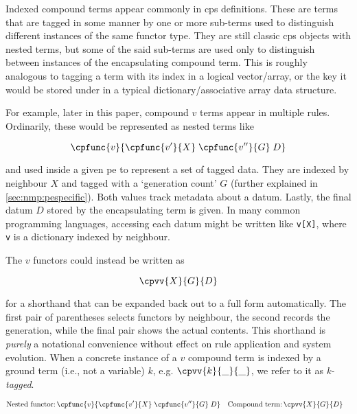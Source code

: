 Indexed compound terms appear commonly in \gls{cps} definitions.  These are terms that are tagged in some manner by one or more sub-terms used to distinguish different instances of the same functor type.  They are still classic \gls{cps} objects with nested terms, but some of the said sub-terms are used only to distinguish between instances of the encapsulating compound term.  This is roughly analogous to tagging a term with its index in a logical vector/array, or the key it would be stored under in a typical dictionary/associative array data structure.

For example, later in this paper, compound \(v\) terms appear in multiple rules.  Ordinarily, these would be represented as nested terms like 
\begin{framed}
\vspace{-1.0cm}
\[ \cpfunc{v}{\cpfunc{v'}{X} \; \cpfunc{v''}{G}\; D} \]
\vspace{-0.7cm}
\end{framed}\noindent
and used inside a given \gls{pe} to represent a set of tagged data.  They are indexed by neighbour \(X\) and tagged with a `generation count' \(G\) (further explained in \autoref{sec:nmp:pespecific}).  Both values track metadata about a datum.  Lastly, the final datum \(D\) stored by the encapsulating term is given.  In many common programming languages, accessing each datum might be written like \texttt{v[X]}, where \texttt{v} is a dictionary indexed by neighbour.

The \(v\) functors could instead be written as
\begin{framed}
\vspace{-1.0cm}
\[ \cpvv{X}{G}{D} \]
\vspace{-0.7cm}
\end{framed}\noindent
for a shorthand that can be expanded back out to a full form automatically.  The first pair of parentheses selects functors by neighbour, the second records the generation, while the final pair shows the actual contents.  This shorthand is \emph{purely} a notational convenience without effect on rule application and system evolution.  When a concrete instance of a \(v\) compound term is indexed by a ground term (i.e., not a variable) \(k\), e.g. \(\cpvv{k}{\_}{\_}\), we refer to it as \emph{k-tagged}.

\begin{framed}
\vspace{-1.1cm}
    \begin{align*}
        \text{Nested functor:}&\, \cpfunc{v}{\cpfunc{v'}{X} \; \cpfunc{v''}{G}\; D} & \text{Compound term:}&\, \cpvv{X}{G}{D}
    \end{align*}
\vspace{-0.8cm}
\end{framed}

